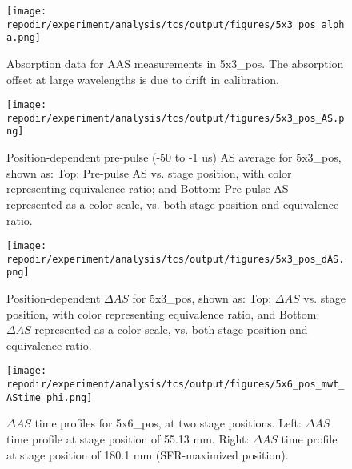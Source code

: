 \begin{figure}[]
\centering
\texttt{[image: \\repodir/experiment/analysis/tcs/output/figures/5x3\_pos\_alpha.png]}
\caption{Absorption data for AAS measurements in 5x3\_pos. The absorption offset at large wavelengths is due to drift in calibration.}
\label{fig:SI_5x3_pos_alpha}
\end{figure}%






\begin{figure}[]
\centering
\texttt{[image: \\repodir/experiment/analysis/tcs/output/figures/5x3\_pos\_AS.png]}
\caption{Position-dependent pre-pulse (-50 to -1 us) AS average for 5x3\_pos, shown as: Top: Pre-pulse AS vs. stage position, with color representing equivalence ratio; and Bottom: Pre-pulse AS represented as a color scale, vs. both stage position and equivalence ratio.}
\label{fig:SI_5x3_pos_AS}
\end{figure}


\begin{figure}[]
    \centering
    \texttt{[image: \\repodir/experiment/analysis/tcs/output/figures/5x3\_pos\_dAS.png]} 
    \caption{Position-dependent $\Delta AS$ for 5x3\_pos, shown as: Top: $\Delta AS$ vs. stage position, with color representing equivalence ratio, and Bottom: $\Delta AS$ represented as a color scale, vs. both stage position and equivalence ratio.}
    \label{fig:SI_5x3_pos_dAS}
\end{figure}


\begin{figure}[]
\centering
\texttt{[image: \\repodir/experiment/analysis/tcs/output/figures/5x6\_pos\_mwt\_AStime\_phi.png]}
\caption{$\Delta AS$ time profiles for 5x6\_pos, at two stage positions. Left: $\Delta AS$ time profile at stage position of 55.13 mm. Right: $\Delta AS$ time profile at stage position of 180.1 mm (SFR-maximized position).}
\label{fig:SI_5x6_pos_mwt_AStime_phi}
\end{figure}


